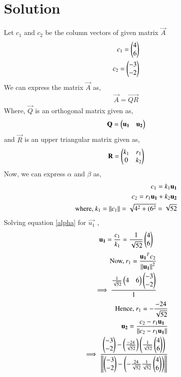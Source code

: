 \documentclass[journal,12pt,twocolumn]{IEEEtran}
\begin{document}
\section{Solution}
Let $c_1$ and $c_2$ be the column vectors of given matrix $\vec{A}$
\begin{align}
c_1 = \begin{pmatrix}4\\6\end{pmatrix}\\
c_2 = \begin{pmatrix}-3\\-2\end{pmatrix}
\end{align}
We can express the matrix $\vec{A}$ as,
\begin{align}
\vec{A}=\vec{QR}
\end{align}
Where, $\vec{Q}$ is an orthogonal matrix given as,
\begin{align}
\mathbf{Q} = \begin{pmatrix}\mathbf{u_1}&\mathbf{u_2}\end{pmatrix}\label{orthogonal}
\end{align}
and $\vec{R}$ is an upper triangular matrix given as,
\begin{align}
\mathbf{R} = \begin{pmatrix}k_1&r_1\\0&k_2\end{pmatrix}
\label{UT}
\end{align}
Now, we can express $\alpha$ and $\beta$ as,
\begin{align}
c_1 = k_1\mathbf{u_1}\label{alpha}\\
c_2 = r_1\mathbf{u_1} +k_2\mathbf{u_2}\label{beta}\\
\mbox{where, } k_1 = \left\lVert c_1\right\rVert = \sqrt{4^2+(6^2} = \sqrt{52}\label{k1}
\end{align} 
Solving equation \eqref{alpha} for $\vec{u_1}$ ,
\begin{align}
\mathbf{u_1} = \frac{c_1}{k_1} = \frac{1}{\sqrt{52}}\begin{pmatrix}4\\6\end{pmatrix}\label{u1}
\end{align}
\begin{align}
\mbox{Now, } r_1 = \frac{\mathbf{u_1}^Tc_2}{\left\lVert\mathbf{u_1}\right\rVert^2}\\
\implies \frac{\frac{1}{\sqrt{52}}\begin{pmatrix}4&6\end{pmatrix}\begin{pmatrix}-3\\-2\end{pmatrix}}{1}
\end{align}
\begin{align}
\mbox{Hence, } r_1 = -\frac{-24}{\sqrt{52}}
\label{r1}\\
\mathbf{u_2} = \frac{c_2-r_1\mathbf{u_1}}{\left\lVert c_2-r_1\mathbf{u_1}\right\rVert}\\
\implies \frac{\begin{pmatrix}-3\\-2\end{pmatrix} - \left(\frac{-24}{\sqrt{52}}\right)\left(\frac{1}{\sqrt{52}}\begin{pmatrix}4\\6\end{pmatrix}\right)}{\left\lVert\begin{pmatrix}-3\\-2\end{pmatrix} - \left(-\frac{24}{\sqrt{52}}\frac{1}{\sqrt{52}}\begin{pmatrix}4\\6\end{pmatrix}\right)\right\rVert} 
\end{align}
\end{document}
